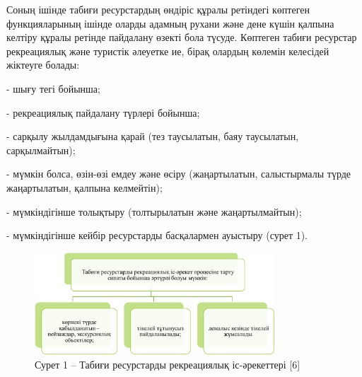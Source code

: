 \begin{multicols}{2}
Соның ішінде табиғи ресурстардың өндіріс құралы ретіндегі көптеген
функцияларының ішінде оларды адамның рухани және дене күшін қалпына
келтіру құралы ретінде пайдалану өзекті бола түсуде. Көптеген табиғи
ресурстар рекреациялық және туристік әлеуетке ие, бірақ олардың көлемін
келесідей жіктеуге болады:

- шығу тегі бойынша;

- рекреациялық пайдалану түрлері бойынша;

- сарқылу жылдамдығына қарай (тез таусылатын, баяу таусылатын,
сарқылмайтын);

- мүмкін болса, өзін-өзі емдеу және өсіру (жаңартылатын, салыстырмалы
түрде жаңартылатын, қалпына келмейтін);

- мүмкіндігінше толықтыру (толтырылатын және жаңартылмайтын);

- мүмкіндігінше кейбір ресурстарды басқалармен ауыстыру (сурет 1).
\end{multicols}

\begin{figure}[H]
	\centering
	\includegraphics[width=0.8\textwidth]{assets/1111}
	\caption*{Сурет 1 -- Табиғи ресурстарды рекреациялық іс-әрекеттері {[}6{]}}
\end{figure}

